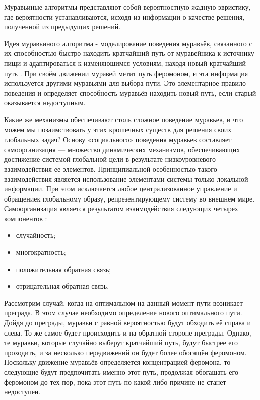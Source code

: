 \documentclass[12pt]{report}
\begin{document}
Муравьиные алгоритмы представляют собой вероятностную жадную эвристику, где вероятности устанавливаются, исходя из информации о качестве решения, полученной из предыдущих решений.

Идея муравьиного алгоритма - моделирование поведения муравьёв, связанного с их способностью быстро находить кратчайший путь от муравейника к источнику пищи и адаптироваться к изменяющимся условиям, находя новый кратчайший путь \cite{shtovba}. При своём движении муравей метит путь феромоном, и эта информация используется другими муравьями для выбора пути. Это элементарное правило поведения и определяет способность муравьёв находить новый путь, если старый оказывается недоступным.

Какие же механизмы обеспечивают столь сложное поведение муравьев, и что можем мы позаимствовать у этих крошечных существ для решения своих глобальных задач? Основу «социального» поведения муравьев составляет самоорганизация — множество динамических механизмов, обеспечивающих достижение системой глобальной цели в результате низкоуровневого взаимодействия ее элементов. Принципиальной особенностью такого взаимодействия является использование элементами системы только локальной информации. При этом исключается любое централизованное управление и обращениек глобальному образу, репрезентирующему систему во внешнем мире. Самоорганизация является результатом взаимодействия следующих четырех компонентов \cite{shtovba} :

\begin{itemize}
	\item случайность;
	\item многократность;
	\item положительная обратная связь;
	\item отрицательная обратная связь.
\end{itemize}

Рассмотрим случай, когда на оптимальном на данный момент пути возникает преграда. В этом случае необходимо определение нового оптимального пути. Дойдя до преграды, муравьи с равной вероятностью будут обходить её справа и слева. То же самое будет происходить и на обратной стороне преграды. Однако, те муравьи, которые случайно выберут кратчайший путь, будут быстрее его проходить, и за несколько передвижений он будет более обогащён феромоном. Поскольку движение муравьёв определяется концентрацией феромона, то следующие будут предпочитать именно этот путь, продолжая обогащать его феромоном до тех пор, пока этот путь по какой-либо причине не станет недоступен.
\end{document}
